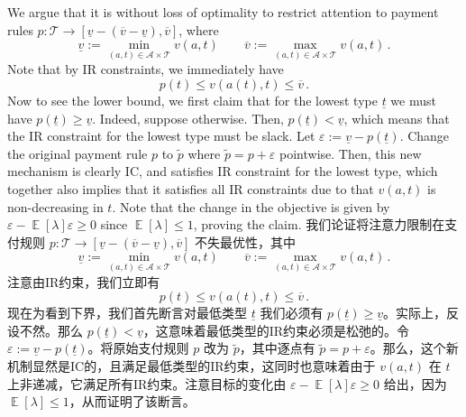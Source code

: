 \documentclass[12pt,letterpaper]{article}
\newenvironment{original}{\color{black}\noindent}{}
\newenvironment{translation}{\color{blue}\noindent}{}
\theoremstyle{plain}
\theoremstyle{definition}
\theoremstyle{remark}
\DeclareMathOperator{\E}{\mathds{E}}
\renewcommand{\1}{\mathds{1}}
\theoremstyle{definition}
\begin{document}
\begin{original}
We argue that it is without loss of optimality to restrict attention to payment rules $p: \mathcal{T} \rightarrow [\underline{v} - (\overline{v} - \underline{v}), \overline{v}]$, where
\[\underline{v}:= \min_{(a, t) \in \mathcal{A} \times \mathcal{T}} v(a, t)\qquad \overline{v}:= \max_{(a, t) \in \mathcal{A} \times \mathcal{T}} v(a, t)\,.\]
Note that by IR constraints, we immediately have
\[p(t) \leq v(a(t), t) \leq \overline{v}\,.\]
Now to see the lower bound, we first claim that for the lowest type $\underline{t}$ we must have
$p(\underline{t}) \geq \underline{v}$. Indeed, suppose otherwise. Then, $p(\underline{t}) < \underline{v}$, which means that the IR constraint for the lowest type must be slack. Let $\varepsilon := \underline{v} - p(\underline{t})$. Change the original payment rule $p$ to $\tilde{p}$ where $\tilde{p} = p + \varepsilon$ pointwise. Then, this new mechanism is clearly IC, and satisfies IR constraint for the lowest type, which together also implies that it satisfies all IR constraints due to that $v(a, t)$ is non-decreasing in $t$. Note that the change in the objective is given by $\varepsilon - \E[\lambda] \varepsilon \geq 0$ since $\E[\lambda] \leq 1$, proving the claim.
\end{original}
\begin{translation}
我们论证将注意力限制在支付规则 $p: \mathcal{T} \rightarrow [\underline{v} - (\overline{v} - \underline{v}), \overline{v}]$ 不失最优性，其中
\[\underline{v}:= \min_{(a, t) \in \mathcal{A} \times \mathcal{T}} v(a, t)\qquad \overline{v}:= \max_{(a, t) \in \mathcal{A} \times \mathcal{T}} v(a, t)\,.\]
注意由IR约束，我们立即有
\[p(t) \leq v(a(t), t) \leq \overline{v}\,.\]
现在为看到下界，我们首先断言对最低类型 $\underline{t}$ 我们必须有 $p(\underline{t}) \geq \underline{v}$。实际上，反设不然。那么 $p(\underline{t}) < \underline{v}$，这意味着最低类型的IR约束必须是松弛的。令 $\varepsilon := \underline{v} - p(\underline{t})$。将原始支付规则 $p$ 改为 $\tilde{p}$，其中逐点有 $\tilde{p} = p + \varepsilon$。那么，这个新机制显然是IC的，且满足最低类型的IR约束，这同时也意味着由于 $v(a, t)$ 在 $t$ 上非递减，它满足所有IR约束。注意目标的变化由 $\varepsilon - \E[\lambda] \varepsilon \geq 0$ 给出，因为 $\E[\lambda] \leq 1$，从而证明了该断言。
\end{translation}
\end{document}
